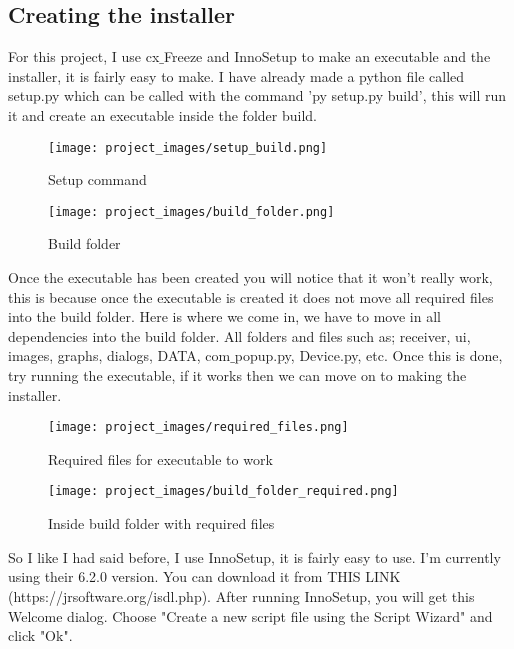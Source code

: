 \subsection{Creating the installer}
	For this project, I use cx$\_$Freeze and InnoSetup to make an executable and the installer, it is fairly easy to make. I have already made a python file called setup.py which can be called with the command 'py setup.py build', this will run it and create an executable inside the folder build.

\begin{figure}[H]
\centering
\texttt{[image: project\_images/setup\_build.png]}
 \caption{Setup command}
 \label{fig:setup command}
\end{figure}	

\begin{figure}[H]
\centering
\texttt{[image: project\_images/build\_folder.png]}
 \caption{Build folder}
 \label{fig:build folder}
\end{figure}	
	
	Once the executable has been created you will notice that it won't really work, this is because once the executable is created it does not move all required files into the build folder. Here is where we come in, we have to move in all dependencies into the build folder. All folders and files such as; receiver, ui, images, graphs, dialogs, DATA, com$\_$popup.py, Device.py, etc. Once this is done, try running the executable, if it works then we can move on to making the installer.

\begin{figure}[H]
\centering
\texttt{[image: project\_images/required\_files.png]}
 \caption{Required files for executable to work}
 \label{fig:required files}
\end{figure}	

\begin{figure}[H]
\centering
\texttt{[image: project\_images/build\_folder\_required.png]}
 \caption{Inside build folder with required files}
 \label{fig:required files in build folder}
\end{figure}	

	So I like I had said before, I use InnoSetup, it is fairly easy to use. I'm currently using their 6.2.0 version. You can download it from THIS LINK (https://jrsoftware.org/isdl.php).
	After running InnoSetup, you will get this Welcome dialog. Choose "Create a new script file using the Script Wizard" and click "Ok".

